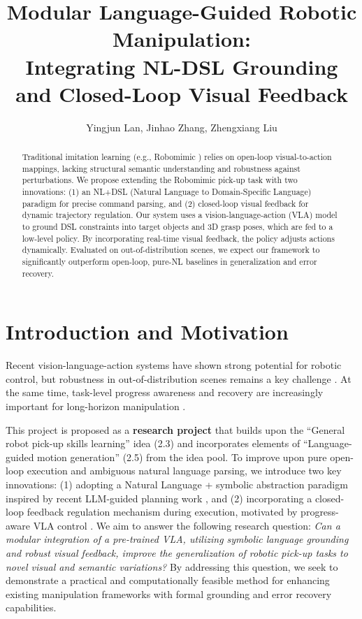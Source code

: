 \documentclass[conference]{IEEEtran}
\begin{document}
 

\title{Modular Language-Guided Robotic Manipulation: \\Integrating NL-DSL Grounding and Closed-Loop Visual Feedback}

\author{Yingjun Lan, Jinhao Zhang, Zhengxiang Liu}

\maketitle

\begin{abstract}
Traditional imitation learning (e.g., Robomimic \cite{robomimic2021}) relies on open-loop visual-to-action mappings, lacking structural semantic understanding and robustness against perturbations. We propose extending the Robomimic pick-up task with two innovations: (1) an NL+DSL (Natural Language to Domain-Specific Language) paradigm for precise command parsing, and (2) closed-loop visual feedback for dynamic trajectory regulation. Our system uses a vision-language-action (VLA) model to ground DSL constraints into target objects and 3D grasp poses, which are fed to a low-level policy. By incorporating real-time visual feedback, the policy adjusts actions dynamically. Evaluated on out-of-distribution scenes, we expect our framework to significantly outperform open-loop, pure-NL baselines in generalization and error recovery.
\end{abstract}

\section{Introduction and Motivation}
\label{sec:intro} 

Recent vision-language-action systems have shown strong potential for robotic control, but robustness in out-of-distribution scenes remains a key challenge \cite{robomonkey2025}. At the same time, task-level progress awareness and recovery are increasingly important for long-horizon manipulation \cite{sprvla2026}.

This project is proposed as a \textbf{research project} that builds upon the ``General robot pick-up skills learning'' idea (2.3) and incorporates elements of ``Language-guided motion generation'' (2.5) from the idea pool. To improve upon pure open-loop execution and ambiguous natural language parsing, we introduce two key innovations: (1) adopting a Natural Language + symbolic abstraction paradigm inspired by recent LLM-guided planning work \cite{plahx2025}, and (2) incorporating a closed-loop feedback regulation mechanism during execution, motivated by progress-aware VLA control \cite{sprvla2026}. We aim to answer the following research question: \emph{Can a modular integration of a pre-trained VLA, utilizing symbolic language grounding and robust visual feedback, improve the generalization of robotic pick-up tasks to novel visual and semantic variations?} By addressing this question, we seek to demonstrate a practical and computationally feasible method for enhancing existing manipulation frameworks with formal grounding and error recovery capabilities.
\end{document}
